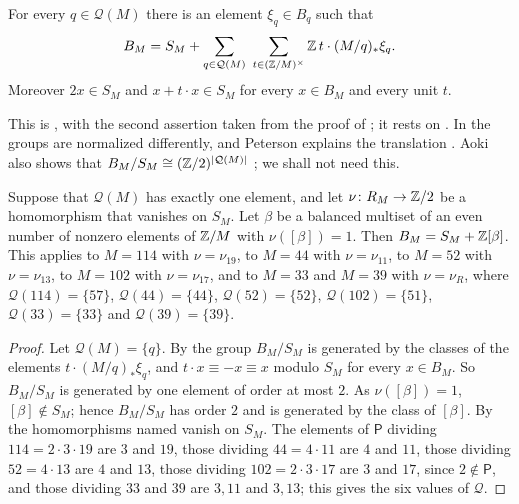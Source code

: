 \begin{theorem}[Aoki]\label{thm:aoki}
For every $q\in\mathcal Q(M)$ there is an element $\xi_{q}\in B_{q}$ such that
\[
  B_{M}=S_{M}+\sum_{q\in\mathcal Q(M)}\ \sum_{t\in(\mathbb{Z}/M)^{\times}}
  \mathbb{Z}\,t\cdot(M/q)_{*}\xi_{q}.
\]
Moreover $2x\in S_{M}$ and $x+t\cdot x\in S_{M}$ for every $x\in B_{M}$ and
every unit $t$.
\end{theorem}

This is \cite[Theorem~2.1]{Aok00}, with the second assertion taken from the
proof of \cite[Corollary~2.3]{Aok00}; it rests on \cite[Theorem~D]{Aok83}.
In \cite{Aok83} the groups are normalized differently, and Peterson explains
the translation \cite[\S5.2]{Pet26}. Aoki also shows that
$B_{M}/S_{M}\cong(\mathbb{Z}/2)^{|\mathcal Q(M)|}$ \cite[Remark~2.4]{Aok00}; we
shall not need this.

\begin{corollary}\label{cor:B114}
Suppose that $\mathcal Q(M)$ has exactly one element, and let $\nu\colon
R_{M}\to\mathbb{Z}/2$ be a homomorphism that vanishes on $S_{M}$. Let $\beta$ be a
balanced multiset of an even number of nonzero elements of $\mathbb{Z}/M$ with
$\nu([\beta])=1$. Then $B_{M}=S_{M}+\mathbb{Z}[\beta]$. This applies to $M=114$
with $\nu=\nu_{19}$, to $M=44$ with $\nu=\nu_{11}$, to $M=52$ with
$\nu=\nu_{13}$, to $M=102$ with $\nu=\nu_{17}$, and to $M=33$ and $M=39$
with $\nu=\nu_{R}$, where $\mathcal Q(114)=\{57\}$, $\mathcal Q(44)=\{44\}$,
$\mathcal Q(52)=\{52\}$, $\mathcal Q(102)=\{51\}$, $\mathcal Q(33)=\{33\}$
and $\mathcal Q(39)=\{39\}$.
\end{corollary}

\begin{proof}
Let $\mathcal Q(M)=\{q\}$. By  the group $B_{M}/S_{M}$ is
generated by the classes of the elements $t\cdot(M/q)_{*}\xi_{q}$, and
$t\cdot x\equiv-x\equiv x$ modulo $S_{M}$ for every $x\in B_{M}$. So
$B_{M}/S_{M}$ is generated by one element of order at most $2$. As
$\nu([\beta])=1$, $[\beta]\notin S_{M}$; hence $B_{M}/S_{M}$ has order $2$
and is generated by the class of $[\beta]$. By  the
homomorphisms named vanish on $S_{M}$. The elements of $\mathsf P$ dividing
$114=2\cdot3\cdot19$ are $3$ and $19$, those dividing $44=4\cdot11$ are $4$
and $11$, those dividing $52=4\cdot13$ are $4$ and $13$, those dividing
$102=2\cdot3\cdot17$ are $3$ and $17$, since $2\notin\mathsf P$, and those
dividing $33$ and $39$ are $3,11$ and $3,13$; this gives the six values of
$\mathcal Q$.
\end{proof}

